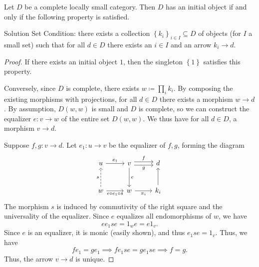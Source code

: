 \begin{theorem}\label{thm:5.10}
	Let $D$ be a complete locally small category. Then $D$ has an initial object if and only if the following property is satisfied.

	Solution Set Condition: there exists a collection $\left\{ k_i \right\}_{i\in I} \subseteq D$ of objects (for $I$ a small set) such that for all $d\in D$ there exists an $i\in I$ and an arrow $k_i\to d$.
\end{theorem}
\begin{proof}
	If there exists an initial object $1$, then the singleton $\left\{ 1 \right\} $ satisfies this property.

	Conversely, since $D$ is complete, there exists $w\coloneqq \prod_{i} k_i$. By composing the existing morphisms with projections, for all $d\in D$ there exists a morphism $w\to d$. By assumption, $D(w,w)$ is small and $D$ is complete, so we can construct the equalizer $e : v \to w$ of the entire set $D(w,w)$. We thus have for all $d\in D$, a morphism $v\to d$.

	Suppose $f,g : v \to d$. Let $e_1 : u \to v$ be the equalizer of $f,g$, forming the diagram
	\[\begin{tikzcd}[row sep = 2.5em, column sep = 2.5em]
	u\ar[" e_1 ", r] & v\ar[" e ", d] \ar[" f ", shift left, r] \ar[" g "', shift right, r]  & d \\
	w\ar[" e\circ e_1\circ s "', r]  \ar[" s ", dashed, u] & w\ar[" \pi _i "', r]  & k_i \ar[u] 
	\end{tikzcd}\]
	The morphism $s$ is induced by commutivity of the right square and the universality of the equalizer. Since $e$ equalizes all endomorphisms of $w$, we have
	\[
		ee_1se=1_we=e1_v
	.\]
	Since $e$ is an equalizer, it is monic (easily shown), and thus $e_1se=1_v$. Thus, we have
	\[
		fe_1=ge_1 \implies fe_1se=ge_1se\implies f=g
	.\]
	Thus, the arrow $v\to d$ is unique.
\end{proof}

